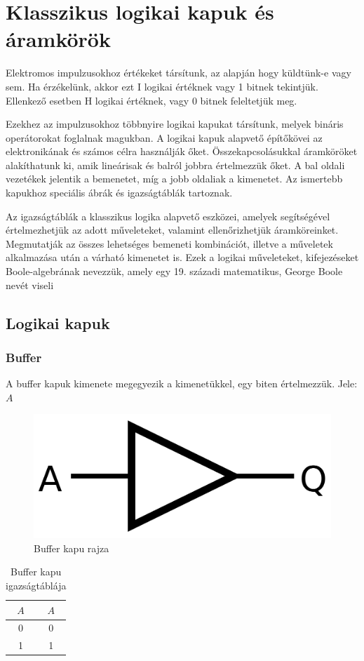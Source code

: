 \documentclass[
]{thesis-ekf}
\theoremstyle{definition}
\theoremstyle{remark}
\begin{document}
\section{Klasszikus logikai kapuk és áramkörök}
Elektromos impulzusokhoz értékeket társítunk, az alapján hogy küldtünk-e vagy sem. Ha érzékelünk, akkor ezt I logikai értéknek vagy 1 bitnek tekintjük. Ellenkező esetben H logikai értéknek, vagy 0 bitnek feleltetjük meg.

Ezekhez az impulzusokhoz többnyire logikai kapukat társítunk, melyek bináris operátorokat foglalnak magukban. A logikai kapuk alapvető építőkövei az elektronikának és számos célra használják őket. Összekapcsolásukkal áramköröket alakíthatunk ki, amik lineárisak és balról jobbra értelmezzük őket. A bal oldali vezetékek jelentik a bemenetet, míg a jobb oldaliak a kimenetet. Az ismertebb kapukhoz speciális ábrák és igazságtáblák tartoznak.

Az igazságtáblák a klasszikus logika alapvető eszközei, amelyek segítségével értelmezhetjük az adott műveleteket, valamint ellenőrizhetjük áramköreinket. Megmutatják az összes lehetséges bemeneti kombinációt, illetve a műveletek alkalmazása után a várható kimenetet is. Ezek a logikai műveleteket, kifejezéseket Boole-algebrának nevezzük, amely egy 19. századi matematikus, George Boole nevét viseli
\subsection{Logikai kapuk}
\subsubsection{Buffer}
A buffer kapuk kimenete megegyezik a kimenetükkel, egy biten értelmezzük. Jele: $A$

\begin{figure}[H]
	\centering
	\includegraphics[width=0.3\linewidth]{buffer}
	\caption{Buffer kapu rajza}
	\label{fig:buffer}
\end{figure}


\begin{table}[H]
	\centering
	\begin{tabular}{c|c}
		$A$ & $A$\\
		\hline
		0 & 0\\
		1 & 1
	\end{tabular}
	\caption{Buffer kapu igazságtáblája}
\end{table}
\end{document}
